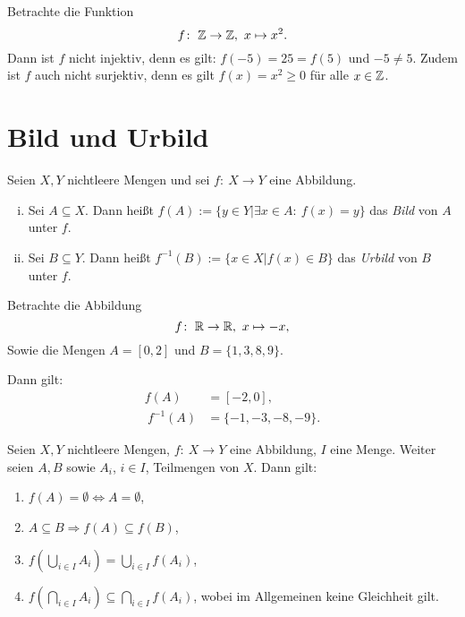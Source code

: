 \begin{example}
Betrachte die Funktion
\[
    f\!:\ \mathbb{Z} \to \mathbb{Z}, \ x \mapsto x^2.
\]
Dann ist $f$ nicht injektiv, denn es gilt: $f(-5) = 25 = f(5)$ und $-5 \neq 5$.
Zudem ist $f$ auch nicht surjektiv, denn es gilt $f(x) = x^2 \geq 0$ für alle
$x \in \mathbb{Z}$.
\end{example}


\section{Bild und Urbild}

\begin{mydef}
Seien $X,Y$ nichtleere Mengen und sei $f\!:\ X \to Y$ eine Abbildung.

\begin{enumerate}[(i)]
\item Sei $A \subseteq X$.
Dann heißt $f(A) := \{y \in Y | \exists x \in A\!:\ f(x) = y \}$
das \textit{Bild} von $A$ unter $f$.

\item Sei $B \subseteq Y$.
Dann heißt $f^{-1}(B) := \{x \in X | f(x) \in B \}$
das \textit{Urbild} von $B$ unter $f$.
\end{enumerate}
\end{mydef}


\begin{example}
Betrachte die Abbildung
\[
  f\!:\ \mathbb{R} \to \mathbb{R}, \ x \mapsto -x,
\]
Sowie die Mengen $A = [0,2]$ und $B = \{1,3,8,9\}$.

Dann gilt:
\begin{align*}
  f(A)      &= [-2,0], \\\
    f^{-1}(A) &= \{-1, -3,-8,-9\}.
\end{align*}
\end{example}


\begin{theorem}
Seien $X,Y$ nichtleere Mengen, $f\!:\ X \to Y$ eine Abbildung, $I$ eine Menge.
Weiter seien $A,B$ sowie $A_i$, $i \in I$, Teilmengen von $X$.
Dann gilt:

\begin{enumerate}
\item $f(A) = \emptyset \iff A = \emptyset$,
\item $A \subseteq B \Rightarrow f(A) \subseteq f(B)$,
\item $f(\bigcup_{i \in I} A_i) = \bigcup_{i \in I} f(A_i)$,
\item $f(\bigcap_{i \in I} A_i) \subseteq \bigcap_{i \in I} f(A_i)$, wobei im
Allgemeinen keine Gleichheit gilt.
\end{enumerate}
\end{theorem}

